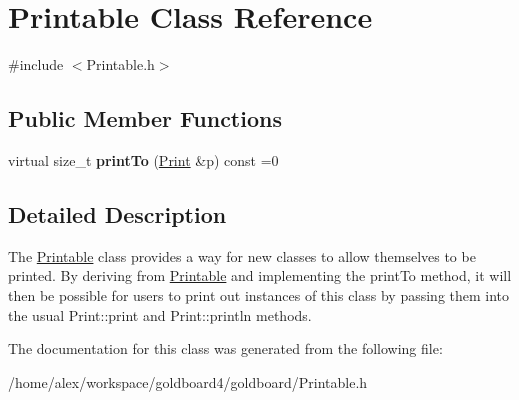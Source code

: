 \hypertarget{class_printable}{}\section{Printable Class Reference}
\label{class_printable}


{\ttfamily \#include $<$Printable.\+h$>$}

\subsection*{Public Member Functions}
\begin{DoxyCompactItemize}
\item 
virtual size\+\_\+t {\bfseries print\+To} (\hyperlink{class_print}{Print} \&p) const =0\hypertarget{class_printable_a2c5776bc55c0a3a5675bba9d4d8e3681}{}\label{class_printable_a2c5776bc55c0a3a5675bba9d4d8e3681}

\end{DoxyCompactItemize}


\subsection{Detailed Description}
The \hyperlink{class_printable}{Printable} class provides a way for new classes to allow themselves to be printed. By deriving from \hyperlink{class_printable}{Printable} and implementing the print\+To method, it will then be possible for users to print out instances of this class by passing them into the usual Print\+::print and Print\+::println methods. 

The documentation for this class was generated from the following file\+:\begin{DoxyCompactItemize}
\item 
/home/alex/workspace/goldboard4/goldboard/Printable.\+h\end{DoxyCompactItemize}

